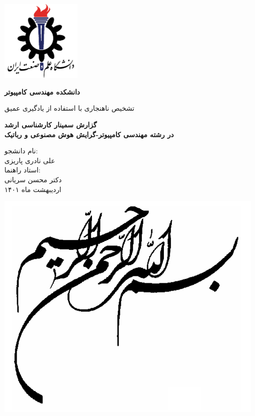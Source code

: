 \documentclass[12pt,a4paper]{report}
\theoremstyle{definition}
\theoremstyle{definition}
\begin{document}
	\thispagestyle{empty}
	\vspace*{25mm}
	\centerline{\includegraphics[height=4cm]{./images/logos/iust.png}}

	\begin{center}
	\textbf{
		دانشکده مهندسی کامپیوتر
	}
	\\[1cm]
	\baselineskip=2cm
	{\titr
	\begin{Huge}
	تشخیص ناهنجاری با استفاده از یادگیری عمیق\\[1cm]
	\end{Huge}}
	{\Large 
		\textbf{
			گزارش سمینار کارشناسی ارشد\\
			در رشته مهندسی کامپیوتر-گرایش هوش مصنوعی و رباتیک
		} \\[1cm]
	}

	{\Large { 
	نام دانشجو:
	}
	\\
	{\Large  علی نادری پاریزی }
	\\[.5cm]
	{\Large  
		استاد راهنما:
	}
	\\
	{\Large دکتر محسن سریانی}
	\\[.6cm]
	}
	اردیبهشت ماه ۱۴۰۱
	\end{center}

	\newpage
		\begin{center}
		\includegraphics[width=\linewidth]{./images/god.png}
		\end{center}
	\newpage
	
\end{document}
